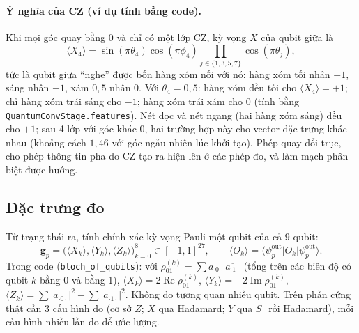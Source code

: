 \documentclass[11pt,a4paper]{article}
\newcommand{\ket}[1]{\lvert #1 \rangle}
\newcommand{\bra}[1]{\langle #1 \rvert}
\newcommand{\expval}[1]{\langle #1 \rangle}
\begin{document}
\paragraph{Ý nghĩa của CZ (ví dụ tính bằng code).}
Khi mọi góc quay bằng 0 và chỉ có một lớp CZ, kỳ vọng $X$ của qubit giữa là
\begin{equation}
\expval{X_4} = \sin(\pi\theta_4)\cos(\pi\phi_4)\prod_{j\in\{1,3,5,7\}}\cos(\pi\theta_j),
\end{equation}
tức là qubit giữa ``nghe'' được bốn hàng xóm nối với nó: hàng xóm tối nhân $+1$, sáng nhân $-1$, xám $0{,}5$ nhân $0$.
Với $\theta_4=0{,}5$: hàng xóm đều tối cho $\expval{X_4}=+1$; chỉ hàng xóm trái sáng cho $-1$; hàng xóm trái
xám cho $0$ (tính bằng \texttt{QuantumConvStage.features}). Nét dọc và nét ngang (hai hàng xóm sáng) đều cho
$+1$; sau 4 lớp với góc khác 0, hai trường hợp này cho vector đặc trưng khác nhau (khoảng cách $1{,}46$ với góc
ngẫu nhiên lúc khởi tạo). Phép quay đổi trục, cho phép thông tin pha do CZ tạo ra hiện lên ở các phép đo,
và làm mạch phân biệt được hướng.

\subsection{Đặc trưng đo}
Từ trạng thái ra, tính chính xác kỳ vọng Pauli một qubit của cả 9 qubit:
\begin{equation}
\bm g_p = \big(\expval{X_k},\expval{Y_k},\expval{Z_k}\big)_{k=0}^{8} \in [-1,1]^{27},
\qquad \expval{O_k} = \bra{\psi_p^{\text{out}}} O_k \ket{\psi_p^{\text{out}}}.
\end{equation}
Trong code (\texttt{bloch\_of\_qubits}): với $\rho^{(k)}_{01}=\sum a_{\cdot0\cdot}\,\overline{a_{\cdot1\cdot}}$
(tổng trên các biên độ có qubit $k$ bằng 0 và bằng 1),
$\expval{X_k}=2\operatorname{Re}\rho^{(k)}_{01}$, $\expval{Y_k}=-2\operatorname{Im}\rho^{(k)}_{01}$,
$\expval{Z_k}=\sum|a_{\cdot0\cdot}|^2-\sum|a_{\cdot1\cdot}|^2$. Không đo tương quan nhiều qubit.
Trên phần cứng thật cần 3 cấu hình đo (cơ sở $Z$; $X$ qua Hadamard; $Y$ qua $S^\dagger$ rồi Hadamard),
mỗi cấu hình nhiều lần đo để ước lượng.
\end{document}
